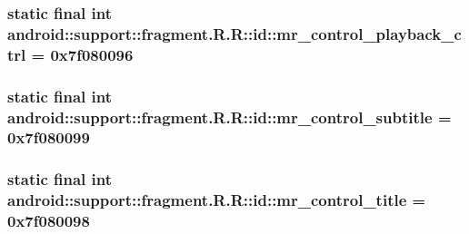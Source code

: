 \hypertarget{classandroid_1_1support_1_1fragment_1_1_r_1_1id_a28e6cc3384772d40f10d323ee217900}{
\subsubsection[{mr\_\-control\_\-playback\_\-ctrl}]{\setlength{\rightskip}{0pt plus 5cm}static final int android::support::fragment.R.R::id::mr\_\-control\_\-playback\_\-ctrl = 0x7f080096}}
\label{classandroid_1_1support_1_1fragment_1_1_r_1_1id_a28e6cc3384772d40f10d323ee217900}


\hypertarget{classandroid_1_1support_1_1fragment_1_1_r_1_1id_2c738fee9d2e158df6a35d963d4a786a}{
\subsubsection[{mr\_\-control\_\-subtitle}]{\setlength{\rightskip}{0pt plus 5cm}static final int android::support::fragment.R.R::id::mr\_\-control\_\-subtitle = 0x7f080099}}
\label{classandroid_1_1support_1_1fragment_1_1_r_1_1id_2c738fee9d2e158df6a35d963d4a786a}


\hypertarget{classandroid_1_1support_1_1fragment_1_1_r_1_1id_0d310ae82a0d3ac7a09a2f919b1e585d}{
\subsubsection[{mr\_\-control\_\-title}]{\setlength{\rightskip}{0pt plus 5cm}static final int android::support::fragment.R.R::id::mr\_\-control\_\-title = 0x7f080098}}
\label{classandroid_1_1support_1_1fragment_1_1_r_1_1id_0d310ae82a0d3ac7a09a2f919b1e585d}



